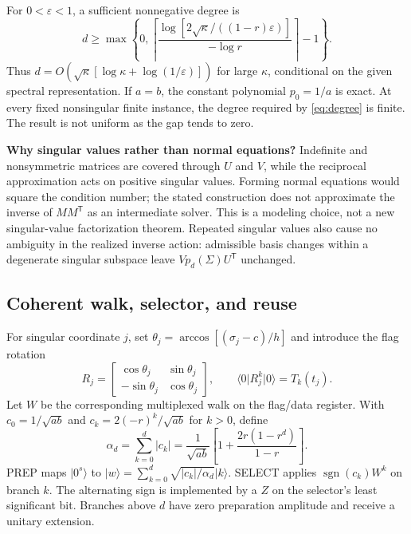 \documentclass[10pt]{article}
\newcommand{\ket}[1]{\lvert #1\rangle}
\newcommand{\bra}[1]{\langle #1\rvert}
\newcommand{\eps}{\varepsilon}
\newcommand{\tr}{\mathsf T}
\begin{document}
For $0<\eps<1$, a sufficient nonnegative degree is
\begin{equation}\label{eq:degree}
 d\ge \max\left\{0,
 \left\lceil\frac{\log[2\sqrt\kappa/((1-r)\eps)]}{-\log r}\right\rceil-1\right\}.
\end{equation}
Thus $d=O(\sqrt\kappa[\log\kappa+\log(1/\eps)])$ for large $\kappa$, conditional on the given spectral representation. If $a=b$, the constant polynomial $p_0=1/a$ is exact. At every fixed nonsingular finite instance, the degree required by \eqref{eq:degree} is finite. The result is not uniform as the gap tends to zero.

\noindent\textbf{Why singular values rather than normal equations?}
Indefinite and nonsymmetric matrices are covered through $U$ and $V$, while the reciprocal approximation acts on positive singular values. Forming normal equations would square the condition number; the stated construction does not approximate the inverse of $MM^{\tr}$ as an intermediate solver. This is a modeling choice, not a new singular-value factorization theorem. Repeated singular values also cause no ambiguity in the realized inverse action: admissible basis changes within a degenerate singular subspace leave $Vp_d(\Sigma)U^{\tr}$ unchanged.

\subsection{Coherent walk, selector, and reuse}\label{sec:circuit}
For singular coordinate $j$, set $\theta_j=\arccos[(\sigma_j-c)/h]$ and introduce the flag rotation
\begin{equation}\label{eq:rotation}
 R_j=\begin{bmatrix}\cos\theta_j&\sin\theta_j\\-\sin\theta_j&\cos\theta_j\end{bmatrix},
 \qquad \bra0 R_j^k\ket0=T_k(t_j).
\end{equation}
Let $W$ be the corresponding multiplexed walk on the flag/data register. With $c_0=1/\sqrt{ab}$ and $c_k=2(-r)^k/\sqrt{ab}$ for $k>0$, define
\begin{equation}\label{eq:alpha}
 \alpha_d=\sum_{k=0}^d|c_k|
 =\frac{1}{\sqrt{ab}}\left[1+\frac{2r(1-r^d)}{1-r}\right].
\end{equation}
PREP maps $\ket{0^s}$ to $\ket w=\sum_{k=0}^d\sqrt{|c_k|/\alpha_d}\ket k$. SELECT applies $\operatorname{sgn}(c_k)W^k$ on branch $k$. The alternating sign is implemented by a $Z$ on the selector's least significant bit. Branches above $d$ have zero preparation amplitude and receive a unitary extension.
\end{document}
